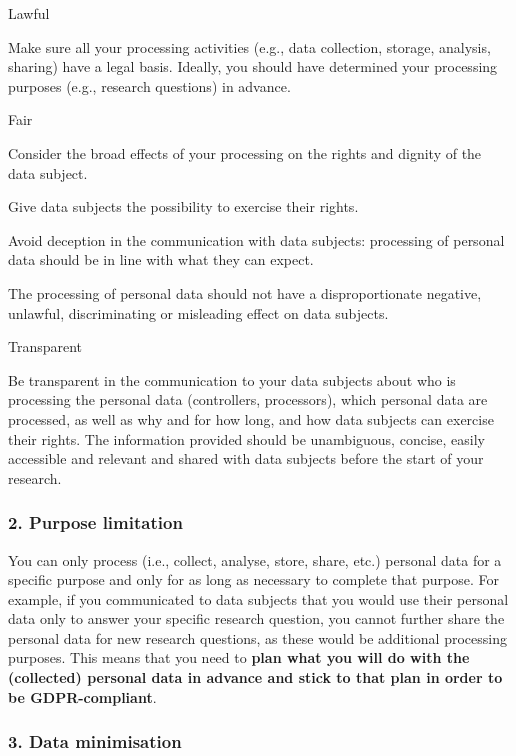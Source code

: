 \documentclass[
]{book}
\begin{document}
Lawful

Make sure all your processing activities (e.g., data collection, storage,
analysis, sharing) have a legal basis. Ideally,
you should have determined your processing purposes (e.g., research questions)
in advance.

Fair

Consider the broad effects of your processing on the rights and dignity of the data subject.

Give data subjects the possibility to exercise their rights.

Avoid deception in the communication with data subjects: processing of personal data should be in line with what they can expect.

The processing of personal data should not have a disproportionate negative, unlawful, discriminating or misleading effect on data subjects.

Transparent

Be transparent in the communication to your data subjects
about who is processing the personal data (controllers, processors), which
personal data are processed, as well as why and for how long, and how data
subjects can exercise their rights. The information provided should be
unambiguous, concise, easily accessible and relevant and shared with data
subjects before the start of your research.

\hypertarget{purpose-limitation}{%
\subsubsection{2. Purpose limitation}\label{purpose-limitation}}

You can only process (i.e., collect, analyse, store, share, etc.) personal data
for a specific purpose and only for as long as necessary to complete that purpose.
For example, if you communicated to data subjects that you would use their
personal data only to answer your specific research question, you cannot further
share the personal data for new research questions, as these would be additional
processing purposes. This means that you need to \textbf{plan what you will do with
the (collected) personal data in advance and stick to that plan in order to be
GDPR-compliant}.

\hypertarget{data-minimisation}{%
\subsubsection{3. Data minimisation}\label{data-minimisation}}
\end{document}

